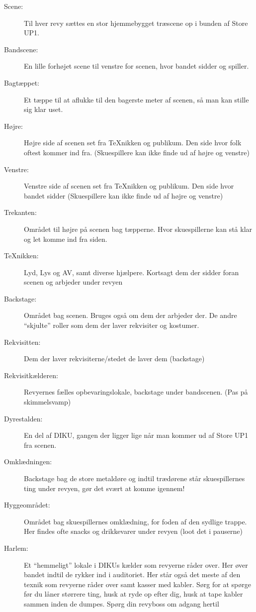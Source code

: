 \documentclass[10pt,a4paper,danish]{article}
\begin{document}
\begin{description}
\item[Scene:] Til hver revy sættes en stor hjemmebygget træscene op i bunden af
  Store UP1.
\item[Bandscene:] En lille forhøjet scene til venstre for scenen, hvor bandet
  sidder og spiller.
\item[Bagtæppet:] Et tæppe til at aflukke til den bagerste meter af scenen, så
  man kan stille sig klar uset.
\item[Højre:] Højre side af scenen set fra TeXnikken og publikum.
  Den side hvor folk oftest kommer ind fra.
  (Skuespillere kan ikke finde ud af højre og venstre)
\item[Venstre:] Venstre  side af scenen set fra TeXnikken og publikum.
  Den side hvor bandet sidder
  (Skuespillere kan ikke finde ud af højre og venstre)
\item[Trekanten:] Området til højre på scenen bag tæpperne. Hvor skuespillerne
  kan stå klar og let komme ind fra siden.
\item[TeXnikken:] Lyd, Lys og AV, samt diverse hjælpere.
  Kortsagt dem der sidder foran scenen og arbjeder under revyen
\item[Backstage:] Området bag scenen. Bruges også om dem der arbjeder der. De
  andre ``skjulte'' roller som dem der laver rekvisiter og kostumer.
\item[Rekvisitten:] Dem der laver rekvisiterne/stedet de laver dem (backstage)
\item[Rekvisitkælderen:] Revyernes fælles opbevaringslokale, backstage under bandscenen.
  (Pas på skimmelsvamp)
\item[Dyrestalden:] En del af DIKU, gangen der ligger lige når man kommer ud af Store UP1 fra
  scenen.
\item[Omklædningen:] Backstage bag de store metaldøre og indtil trædørene står skuespillernes ting
  under revyen, gør det svært at komme igennem!
\item[Hyggeområdet:] Området bag skuespillernes omklædning, for foden af den sydlige trappe.
  Her findes ofte snacks og drikkevarer under revyen (loot det i pauserne)
\item[Harlem:] Et ``hemmeligt'' lokale i DIKUs kælder som revyerne råder over. Her øver
  bandet indtil de rykker ind i auditoriet. Her står også det meste af den
  texnik som revyerne råder over samt kasser med kabler.
  Sørg for at spørge før du låner størrere ting, husk at ryde op efter dig, husk
  at tape kabler sammen inden de dumpes. Spørg din revyboss om adgang hertil

\end{description}
\end{document}
